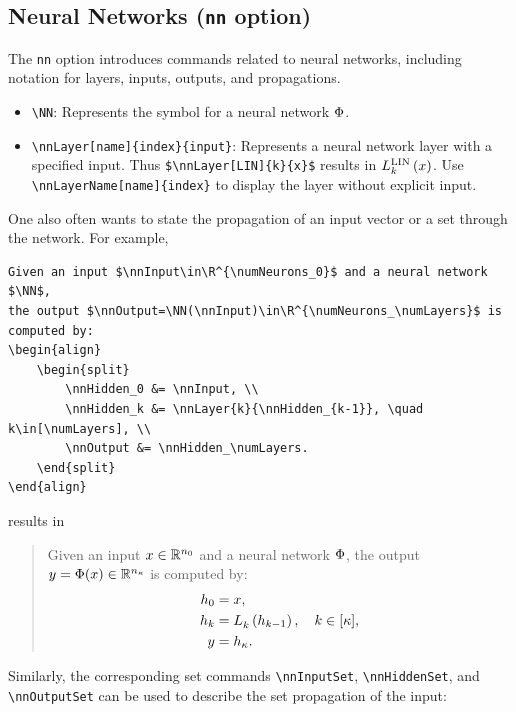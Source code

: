 \documentclass{article}
\begin{document}
\subsection{Neural Networks (\texttt{nn} option)} \label{sec:nn}
The \texttt{nn} option introduces commands related to neural networks, including notation for layers, inputs, outputs, and propagations.

\begin{itemize}
  \item \verb|\NN|: Represents the symbol for a neural network $\NN$.
  \item \verb|\nnLayer[name]{index}{input}|: Represents a neural network layer with a specified input. Thus \verb|$\nnLayer[LIN]{k}{x}$| results in $\nnLayer[LIN]{k}{x}$. Use \verb|\nnLayerName[name]{index}| to display the layer without explicit input.
\end{itemize}
One also often wants to state the propagation of an input vector or a set through the network.
For example,
\begin{verbatim}
Given an input $\nnInput\in\R^{\numNeurons_0}$ and a neural network $\NN$,
the output $\nnOutput=\NN(\nnInput)\in\R^{\numNeurons_\numLayers}$ is computed by:
\begin{align}
    \begin{split}
        \nnHidden_0 &= \nnInput, \\
        \nnHidden_k &= \nnLayer{k}{\nnHidden_{k-1}}, \quad k\in[\numLayers], \\
        \nnOutput &= \nnHidden_\numLayers.
    \end{split}
\end{align}
\end{verbatim}
results in
\begin{quote}
  Given an input $\nnInput\in\R^{\numNeurons_0}$ and a neural network $\NN$,
  the output $\nnOutput=\NN(\nnInput)\in\R^{\numNeurons_\numLayers}$ is computed by:
  \begin{align}
    \begin{split}
      \nnHidden_0 &= \nnInput, \\
      \nnHidden_k &= \nnLayer{k}{\nnHidden_{k-1}}, \quad k\in[\numLayers], \\
      \nnOutput &= \nnHidden_\numLayers.
    \end{split}
  \end{align}
\end{quote}

Similarly, the corresponding set commands \verb|\nnInputSet|, \verb|\nnHiddenSet|, and \verb|\nnOutputSet| can be used to describe the set propagation of the input:
\end{document}
